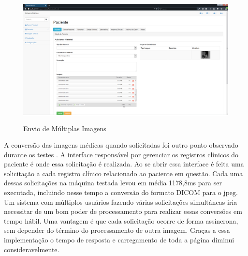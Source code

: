 \begin{figure}[ht]
	\centering	
	\caption[\hspace{0.1cm}Imagens Clínicas.]{Envio de Múltiplas Imagens}
	\vspace{-0.4cm}
	\includegraphics[width=.8\textwidth]{figuras/envioMultiplasImagens15mb.png}
	\vspace{-0.2cm}
	\label{fig:figura4}
\end{figure}

A conversão das imagens médicas quando solicitadas foi outro ponto observado durante os testes . A interface responsável por gerenciar os registros clínicos do paciente é onde essa solicitação é realizada. Ao se abrir essa interface é feita uma solicitação a cada registro clínico relacionado ao paciente em questão. Cada uma dessas solicitações na máquina testada levou em média 1178,8ms para ser executada, incluindo nesse tempo a conversão do formato DICOM para o jpeg. Um sistema com  múltiplos usuários fazendo várias solicitações simultâneas iria necessitar de um bom poder de processamento para realizar essas conversões em tempo hábil. Uma vantagem é que cada solicitação ocorre de forma assíncrona, sem depender do término do processamento de outra imagem. Graças a essa implementação o tempo de resposta e carregamento de toda a página diminui consideravelmente.

